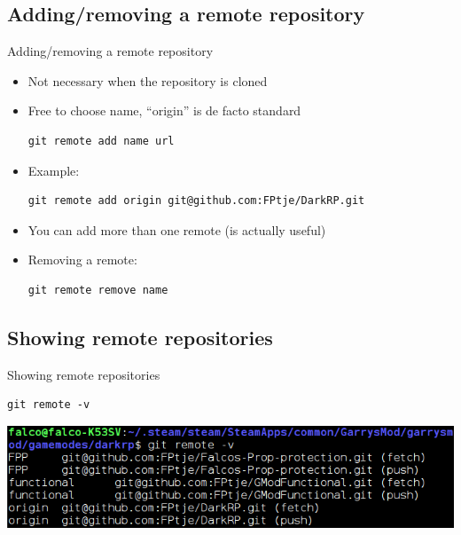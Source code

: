 \documentclass[10pt,a4paper]{beamer}
\begin{document}
\subsection{Adding/removing a remote repository}
\begin{frame}[fragile]{Adding/removing a remote repository}
\begin{itemize}
\item Not necessary when the repository is cloned
\item Free to choose name, ``origin'' is de facto standard
\begin{verbatim}git remote add name url\end{verbatim}
\item Example:
\begin{verbatim}git remote add origin git@github.com:FPtje/DarkRP.git\end{verbatim}
\item You can add more than one remote (is actually useful)
\item Removing a remote:
\begin{verbatim}git remote remove name\end{verbatim}
\end{itemize}
\end{frame}

\subsection{Showing remote repositories}
\begin{frame}[fragile]{Showing remote repositories}
\begin{verbatim}git remote -v\end{verbatim}
\includegraphics[width=\linewidth]{gitremote.png}
\end{frame}
\end{document}
